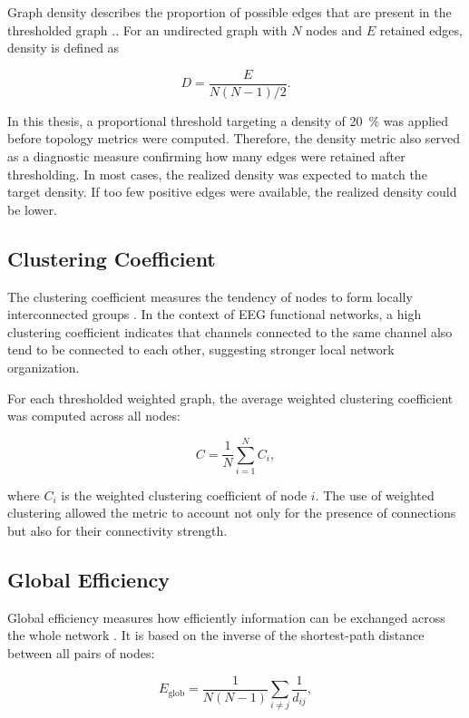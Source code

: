 Graph density describes the proportion of possible edges that are present in
the thresholded graph \cite{Rubinov2010,VanWijk2010}.. For an undirected graph with $N$ nodes and $E$ retained
edges, density is defined as

\[
    D =
    \frac{E}{N(N-1)/2}.
\]

In this thesis, a proportional threshold targeting a density of
\SI{20}{\percent} was applied before topology metrics were computed. Therefore,
the density metric also served as a diagnostic measure confirming how many
edges were retained after thresholding. In most cases, the realized density was
expected to match the target density. If too few positive edges were available,
the realized density could be lower.

\subsection{Clustering Coefficient}
\label{subsec:clustering-coefficient}

The clustering coefficient measures the tendency of nodes to form locally
interconnected groups \cite{Watts1998,Onnela2005,Rubinov2010}. In the context of EEG functional networks, a high
clustering coefficient indicates that channels connected to the same channel
also tend to be connected to each other, suggesting stronger local network
organization.

For each thresholded weighted graph, the average weighted clustering
coefficient was computed across all nodes:

\[
    C =
    \frac{1}{N}
    \sum_{i=1}^{N} C_i,
\]

where $C_i$ is the weighted clustering coefficient of node $i$. The use of
weighted clustering allowed the metric to account not only for the presence of
connections but also for their connectivity strength.

\subsection{Global Efficiency}
\label{subsec:global-efficiency}

Global efficiency measures how efficiently information can be exchanged across
the whole network \cite{Latora2001,Rubinov2010}. It is based on the inverse of the shortest-path distance
between all pairs of nodes:

\[
    E_{\mathrm{glob}}
    =
    \frac{1}{N(N-1)}
    \sum_{i \neq j}
    \frac{1}{d_{ij}},
\]

